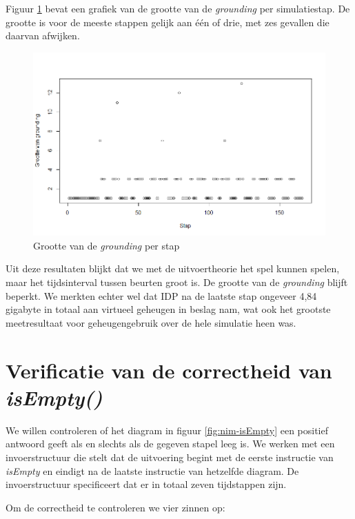 Figuur \ref{fig:groundingsize} bevat een grafiek van de grootte van de \textit{grounding} per simulatiestap. De grootte is voor de meeste stappen gelijk aan \'e\'en of drie, met zes gevallen die daarvan afwijken.

\begin{figure}
	\includegraphics[width=1.05\textwidth]{chap-evaluatie/groundingsize.png}
	\caption{Grootte van de \textit{grounding} per stap}
	\label{fig:groundingsize}
\end{figure}

Uit deze resultaten blijkt dat we met de uitvoertheorie het spel kunnen spelen, maar het tijdsinterval tussen beurten groot is. De grootte van de \textit{grounding} blijft beperkt. We merkten echter wel dat IDP na de laatste stap ongeveer 4,84 gigabyte in totaal aan virtueel geheugen in beslag nam, wat ook het grootste meetresultaat voor geheugengebruik over de hele simulatie heen was.

\section{Verificatie van de correctheid van \textit{isEmpty()}}

We willen controleren of het diagram in figuur \ref{fig:nim-isEmpty} een positief antwoord geeft als en slechts als de gegeven stapel leeg is. We werken met een invoerstructuur die stelt dat de uitvoering begint met de eerste instructie van \textit{isEmpty} en eindigt na de laatste instructie van hetzelfde diagram. De invoerstructuur specificeert dat er in totaal zeven tijdstappen zijn.

Om de correctheid te controleren we vier zinnen op:

